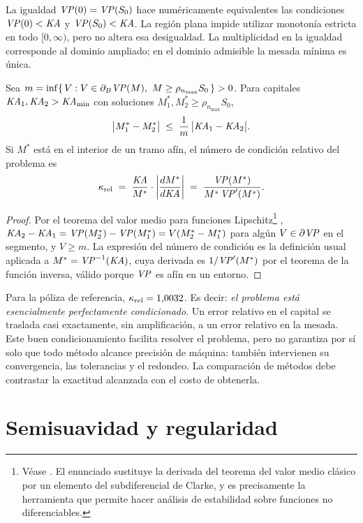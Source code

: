 \begin{remark}
La igualdad $\mathit{VP}(0)=\mathit{VP}(S_0)$ hace numéricamente equivalentes las
condiciones $\mathit{VP}(0)<\mathit{KA}$ y $\mathit{VP}(S_0)<\mathit{KA}$. La región plana impide
utilizar monotonía estricta en todo $[0,\infty)$, pero no altera esa
desigualdad. La multiplicidad en la igualdad corresponde al dominio
ampliado; en el dominio admisible la mesada mínima es única.
\end{remark}

\begin{theorem}
\label{thm:condicionamiento}
Sea $m=\inf\{\,V : V\in\partial_B\mathit{VP}(M),\ M\ge \rho_{n_{\max}}S_0\,\}>0$. Para capitales
$\mathit{KA}_1,\mathit{KA}_2>\mathit{KA}_{\min}$ con soluciones
$M_1^*,M_2^*\ge\rho_{n_{\max}}S_0$,
\[
  \bigl|M_1^*-M_2^*\bigr|\;\le\;\frac{1}{m}\,\bigl|\mathit{KA}_1-\mathit{KA}_2\bigr| .
\]
Si $M^*$ está en el interior de un tramo afín, el número de condición
relativo del problema es
\[
  \kappa_{\mathrm{rel}}
  \;=\;\frac{\mathit{KA}}{M^*}\cdot\left|\frac{dM^*}{d\mathit{KA}}\right|
  \;=\;\frac{\mathit{VP}(M^*)}{M^*\,\mathit{VP}'(M^*)} .
\]
\end{theorem}
\begin{proof}
Por el teorema del valor medio para funciones Lipschitz\footnote{Véase \citet[Teorema~2.3.7]{clarke1983}. El enunciado sustituye la derivada del teorema del valor medio clásico por un elemento del subdiferencial de Clarke, y es precisamente la herramienta que permite hacer análisis de estabilidad sobre funciones no diferenciables.}
\citep[Teorema 2.3.7]{clarke1983}, $\mathit{KA}_2-\mathit{KA}_1=\mathit{VP}(M_2^*)-\mathit{VP}(M_1^*)=V(M_2^*-M_1^*)$
para algún $V\in\partial\mathit{VP}$ en el segmento, y $V\ge m$. La expresión del número de
condición es la definición usual aplicada a $M^*=\mathit{VP}^{-1}(\mathit{KA})$, cuya derivada es
$1/\mathit{VP}'(M^*)$ por el teorema de la función inversa, válido porque $\mathit{VP}$ es afín en
un entorno.
\end{proof}

Para la póliza de referencia, $\kappa_{\mathrm{rel}}=1{,}0032$. Es decir:
\emph{el problema está esencialmente perfectamente condicionado}. Un error
relativo en el capital se traslada casi exactamente, sin amplificación, a un error
relativo en la mesada. Este buen condicionamiento facilita resolver el problema,
pero no garantiza por sí solo que todo método alcance precisión de máquina:
también intervienen su convergencia, las tolerancias y el redondeo. La comparación
de métodos debe contrastar la exactitud alcanzada con el costo de obtenerla.

\section{Semisuavidad y regularidad}

